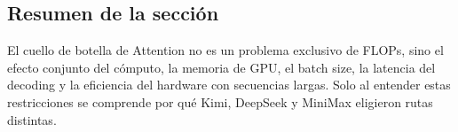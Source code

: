 \subsection{Resumen de la sección}

El cuello de botella de Attention no es un problema exclusivo de FLOPs, sino el efecto conjunto del cómputo, la memoria de GPU, el batch size, la latencia del decoding y la eficiencia del hardware con secuencias largas. Solo al entender estas restricciones se comprende por qué Kimi, DeepSeek y MiniMax eligieron rutas distintas.
